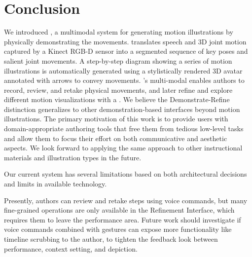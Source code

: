 \section {Conclusion}
We introduced \systemname{}, a multimodal system for generating motion illustrations by physically demonstrating the movements.
\systemname{} translates speech and 3D joint motion captured by a Kinect RGB-D sensor into a segmented sequence of key poses and salient joint movements.
A step-by-step diagram showing a series of motion illustrations is automatically generated using a stylistically rendered 3D avatar annotated with arrows to convey movements.
%
\systemname{}'s multi-modal \phaseI{} enables authors to record, review, and retake physical movements, and later refine and explore different motion visualizations with a \phaseII{}. We believe the Demonstrate-Refine distinction generalizes to other demonstration-based interfaces beyond motion illustrations.
%
The primary motivation of this work is to provide users with domain-appropriate authoring tools that free them from tedious low-level tasks and allow them to focus their effort on both communicative and aesthetic aspects. We look forward to applying the same approach to other instructional materials and illustration types in the future.



Our current system has several limitations based on both architectural decisions and limits in available technology.

 Presently, authors can review and retake steps using voice commands, but many fine-grained operations are only available in the Refinement Interface, which requires them to leave the performance area. Future work should investigate if voice commands combined with gestures can expose more functionality like timeline scrubbing to the author, to tighten the feedback look between performance, context setting, and depiction.

